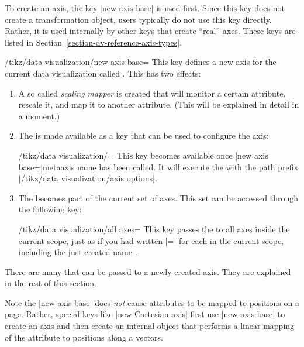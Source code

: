 To create an axis, the key |new axis base| is used first. Since this key
does not create a transformation object, users typically do not use
this key directly. Rather, it is used internally by other keys
that create ``real'' axes. These keys are listed in
Section~\ref{section-dv-reference-axis-types}. 

\begin{key}{/tikz/data visualization/new axis base=}
  This key defines a new axis for the current data visualization
  called . This has two effects:
  \begin{enumerate}
  \item A so called \emph{scaling mapper} is created that will monitor
    a certain attribute, rescale it, and map it to another
    attribute. (This will be explained in detail in a moment.)
  \item The  is made available as a key that can be
    used to configure the axis:
    \begin{key}{/tikz/data visualization/=}
      This key becomes available once |new axis base=|meta{axis name} has
      been called. It will execute the  with the path
      prefix |/tikz/data visualization/axis options|.
\begin{codeexample}
\end{codeexample}
    \end{key}
  \item The  becomes part of the current set of
    axes. This set can be accessed through the following key:
    \begin{key}{/tikz/data visualization/all axes=}
      This key passes the  to all axes inside the
      current scope, just as if you had written |=| for each  in the
      current scope, including the just-created name .
    \end{key}
  \end{enumerate}
  There are many  that can be passed to a newly created
  axis. They are explained in the rest of this section.
\end{key}

Note the |new axis base| does \emph{not} cause attributes to be mapped to
positions on a page. Rather, special keys like |new Cartesian axis|
first use |new axis base| to create an axis and then create an internal
object that performs a linear mapping of the attribute to 
positions along a vectors.


